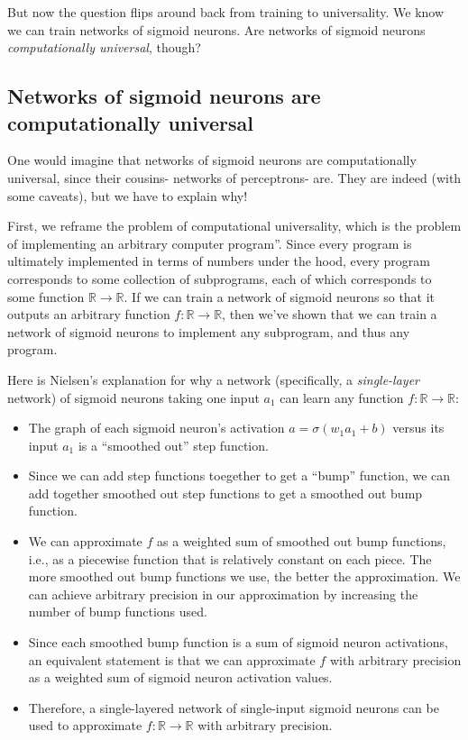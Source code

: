 \documentclass{article}
\begin{document}
	But now the question flips around back from training to universality. We know we can train networks of sigmoid neurons. Are networks of sigmoid neurons \textit{computationally universal}, though?
	
	\subsection*{Networks of sigmoid neurons are computationally universal}
	
	One would imagine that networks of sigmoid neurons are computationally universal, since their cousins- networks of perceptrons- are. They are indeed (with some caveats), but we have to explain why!
	
	First, we reframe the problem of computational universality, which is the problem of implementing an arbitrary computer program''. Since every program is ultimately implemented in terms of numbers under the hood, every program corresponds to some collection of subprograms, each of which corresponds to some function $\mathbb{R} \rightarrow \mathbb{R}$. If we can train a network of sigmoid neurons so that it outputs an arbitrary function $f:\mathbb{R} \rightarrow \mathbb{R}$, then we've shown that we can train a network of sigmoid neurons to implement any subprogram, and thus any program.
	
	Here is Nielsen's explanation for why a network (specifically, a \textit{single-layer} network) of sigmoid neurons taking one input $a_1$  can learn any function $f:\mathbb{R} \rightarrow \mathbb{R}$:
	
	\begin{itemize}
		\item The graph of each sigmoid neuron's activation $a = \sigma(w_1 a_1 + b)$ versus its input $a_1$ is a ``smoothed out'' step function.
		\item Since we can add step functions toegether to get a ``bump'' function, we can add together smoothed out step functions to get a smoothed out bump function.
		\item We can approximate $f$ as a weighted sum of smoothed out bump functions, i.e., as a piecewise function that is relatively constant on each piece. The more smoothed out bump functions we use, the better the approximation. We can achieve arbitrary precision in our approximation by increasing the number of bump functions used.
		\item Since each smoothed bump function is a sum of sigmoid neuron activations, an equivalent statement is that we can approximate $f$ with arbitrary precision as a weighted sum of sigmoid neuron activation values.
		\item Therefore, a single-layered network of single-input sigmoid neurons can be used to approximate $f:\mathbb{R} \rightarrow \mathbb{R}$ with arbitrary precision.
	\end{itemize}
	
\end{document}
